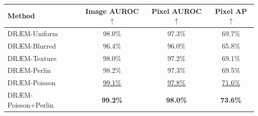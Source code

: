            \begin{tabular}{lccc}
                \hline
                \textbf{Method} & \textbf{Image AUROC} $\uparrow$ & \textbf{Pixel AUROC} $\uparrow$ & \textbf{Pixel AP} $\uparrow$ \\
                \hline
                DRÆM-Uniform & \cellcolor[HTML]{E3F399} 98.0\% & \cellcolor[HTML]{BFE47A} 97.3\% & \cellcolor[HTML]{FFFEBE} 69.7\% \\
                DRÆM-Blurred & \cellcolor[HTML]{A50026} 96.4\% & \cellcolor[HTML]{A50026} 96.0\% & \cellcolor[HTML]{A50026} 65.8\% \\
                DRÆM-Texture & \cellcolor[HTML]{E3F399} 98.0\% & \cellcolor[HTML]{D9EF8B} 97.2\% & \cellcolor[HTML]{FEE797} 69.1\% \\
                DRÆM-Perlin & \cellcolor[HTML]{C3E67D} 98.2\% & \cellcolor[HTML]{BFE47A} 97.3\% & \cellcolor[HTML]{FFF7B2} 69.5\% \\
                DRÆM-Poisson & \cellcolor[HTML]{097940} \underline{99.1\%} & \cellcolor[HTML]{199750} \underline{97.8\%} & \cellcolor[HTML]{89CC67} \underline{71.6\%} \\
                DRÆM-Poisson+Perlin & \cellcolor[HTML]{006837} \textbf{99.2\%} & \cellcolor[HTML]{006837} \textbf{98.0\%} & \cellcolor[HTML]{006837} \textbf{73.6\%} \\
                \hline
            \end{tabular}